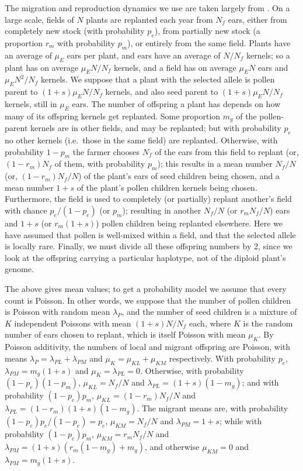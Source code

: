 The migration and reproduction dynamics we use are taken largely from \citet{vanHeerwaarden2010}.  
On a large scale,
fields of $N$ plants are replanted each year from $N_f$ ears,
either from completely new stock (with probability $p_e$),
from partially new stock (a proportion $r_m$ with probability $p_m$),
or entirely from the same field.
Plants have an average of $\mu_E$ ears per plant, and ears have an average of $N/N_f$ kernels; 
so a plant has on average $\mu_E N/N_f$ kernels, and a field has on average $\mu_E N$ ears and $\mu_E N^2/N_f$ kernels.
We suppose that a plant with the selected allele is pollen parent to $(1+s) \mu_E N/N_f$ kernels,
and also seed parent to $(1+s)\mu_E N/N_f$ kernels, still in $\mu_E$ ears.
The number of offspring a plant has depends on how many of its offspring kernels get replanted.
Some proportion $m_g$ of the pollen-parent kernels are in other fields, and may be replanted;
but with probability $p_e$ no other kernels (i.e.~those in the same field) are replanted.
Otherwise, with probability $1-p_m$ the farmer chooses $N_f$ of the ears from this field to replant
(or, $(1-r_m) N_f$ of them, with probability $p_m$);
this results in a mean number $N_f/N$ (or, $(1-r_m)N_f/N$) of the plant's ears of seed children being chosen,
and a mean number $1+s$ of the plant's pollen children kernels being chosen.
Furthermore, the field is used to completely (or partially) replant another's field with chance $p_e/(1-p_e)$ (or $p_m$);
resulting in another $N_f/N$ (or $r_m N_f/N$) ears and $1+s$ (or $r_m (1+s)$) pollen children being replanted elsewhere.
Here we have assumed that pollen is well-mixed within a field,
and that the selected allele is locally rare.
Finally, we must divide all these offspring numbers by 2,
since we look at the offspring carrying a particular haplotype, not of the diploid plant's genome.

The above gives mean values; to get a probability model we assume that every count is Poisson.
In other words, we suppose that the number of pollen children is Poisson with random mean $\lambda_P$,
and the number of seed children is a mixture of $K$ independent Poissons with mean $(1+s)N/N_f$ each,
where $K$ is the random number of ears chosen to replant, which is itself Poisson with mean $\mu_K$.
By Poisson additivity, the numbers of local and migrant offspring are Poisson,
with means $\lambda_P = \lambda_{PL} + \lambda_{PM}$ and $\mu_K = \mu_{KL} + \mu_{KM}$ respectively.
With probability $p_e$, $\lambda_{PM} = m_g(1+s)$ and $\mu_K = \lambda_{PL} = 0$.
Otherwise, with probability $(1-p_e)(1-p_m)$, $\mu_{KL} = N_f/N$ and $\lambda_{PL} = (1+s)(1-m_g)$;
and with probability $(1-p_e)p_m$, $\mu_{KL} = (1-r_m) N_f/N$ and $\lambda_{PL} = (1-r_m)(1+s)(1-m_g)$.
The migrant means are,
with probability $(1-p_e) p_e/(1-p_e) = p_e$, $\mu_{KM} = N_f/N$ and $\lambda_{PM} = 1+s$;
while with probability $(1-p_e) p_m$, $\mu_{KM} = r_m N_f/N$ and $\lambda_{PM} = (1+s)(r_m(1-m_g) + m_g)$,
and otherwise $\mu_{KM} = 0$ and $\lambda_{PM} = m_g(1+s)$.


